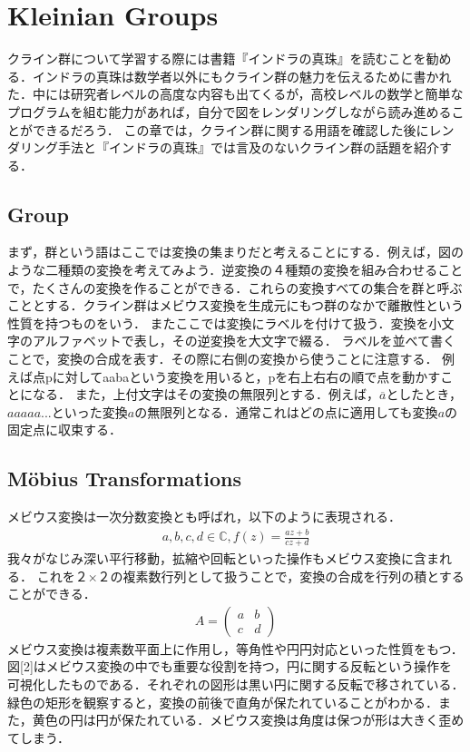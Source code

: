 
\section{Kleinian Groups}
クライン群について学習する際には書籍『インドラの真珠』\cite{indra}を読むことを勧める．インドラの真珠は数学者以外にもクライン群の魅力を伝えるために書かれた．中には研究者レベルの高度な内容も出てくるが，高校レベルの数学と簡単なプログラムを組む能力があれば，自分で図をレンダリングしながら読み進めることができるだろう．
この章では，クライン群に関する用語を確認した後にレンダリング手法と『インドラの真珠』では言及のないクライン群の話題を紹介する．

\subsection{Group}
まず，群という語はここでは変換の集まりだと考えることにする．例えば，図のような二種類の変換を考えてみよう．逆変換の４種類の変換を組み合わせることで，たくさんの変換を作ることができる．これらの変換すべての集合を群と呼ぶこととする．クライン群はメビウス変換を生成元にもつ群のなかで離散性という性質を持つものをいう．
またここでは変換にラベルを付けて扱う．変換を小文字のアルファベットで表し，その逆変換を大文字で綴る．
ラベルを並べて書くことで，変換の合成を表す．その際に右側の変換から使うことに注意する．
例えば点pに対してaabaという変換を用いると，pを右上右右の順で点を動かすことになる．
また，上付文字はその変換の無限列とする．例えば，$\overline{a}$としたとき，$aaaaa...$といった変換$a$の無限列となる．通常これはどの点に適用しても変換$a$の固定点に収束する．


\subsection{M\"obius Transformations}
メビウス変換は一次分数変換とも呼ばれ，以下のように表現される．
\begin{eqnarray*}
 a, b, c, d\in \mathbb{C}, f(z) = \frac{az + b}{cz + d}
\end{eqnarray*}
我々がなじみ深い平行移動，拡縮や回転といった操作もメビウス変換に含まれる．
これを２×２の複素数行列として扱うことで，変換の合成を行列の積とすることができる．
\begin{eqnarray*}
  A = \left(
    \begin{array}{ccc}
      a & b \\
      c & d
    \end{array}
  \right)
\end{eqnarray*}
メビウス変換は複素数平面上に作用し，等角性や円円対応といった性質をもつ．
図[2]はメビウス変換の中でも重要な役割を持つ，円に関する反転という操作を可視化したものである．それぞれの図形は黒い円に関する反転で移されている．緑色の矩形を観察すると，変換の前後で直角が保たれていることがわかる．また，黄色の円は円が保たれている．メビウス変換は角度は保つが形は大きく歪めてしまう．

